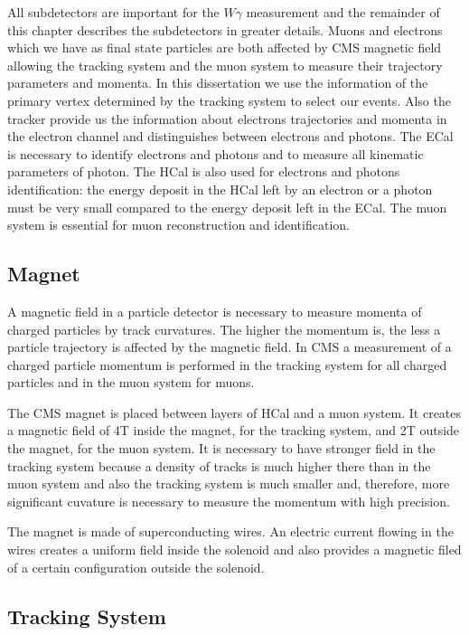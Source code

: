 All subdetectors are important for the $W\gamma$ measurement and the remainder of this chapter describes the subdetectors in greater details. Muons and electrons which we have as final state particles are both affected by CMS magnetic field allowing the tracking system and the muon system to measure their trajectory parameters and momenta. In this dissertation we use the information of the primary vertex determined by the tracking system to select our events. Also the tracker provide us the information about electrons trajectories and momenta in the electron channel and distinguishes between electrons and photons. The ECal is necessary to identify electrons and photons and to measure all kinematic parameters of photon. The HCal is also used for electrons and photons identification: the energy deposit in the HCal left by an electron or a photon must be very small compared to the energy deposit left in the ECal. The muon system is essential for muon reconstruction and identification.

\subsection{Magnet}

A magnetic field in a particle detector is necessary to measure momenta of charged particles by track curvatures. The higher the momentum is, the less a particle trajectory is affected by the magnetic field. In CMS a measurement of a charged particle momentum is performed in the tracking system for all charged particles and in the muon system for muons.

The CMS magnet is placed between layers of HCal and a muon system. It creates a magnetic field of 4T inside the magnet, for the tracking system, and 2T outside the magnet, for the muon system. It is necessary to have stronger field in the tracking system because a density of tracks is much higher there than in the muon system and also the tracking system is much smaller and, therefore, more significant cuvature is necessary to measure the momentum with high precision.

The magnet is made of superconducting wires. An electric current flowing in the wires creates a uniform field inside the solenoid and also provides a magnetic filed of a certain configuration outside the solenoid.

\subsection{Tracking System}

